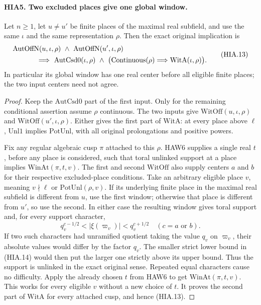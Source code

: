 \paragraph{HIA5. Two excluded places give one global window.}
\label{claim:HIA5}
Let \(n\geq1\), let \(u\ne u'\) be finite places of the
maximal real subfield, and use the same \(\iota\) and
the same representation \(\rho\).  Then the exact
original implication is
\[
 \begin{split}
 &\mathrm{AutOffN}(u,\iota,\rho)\ \wedge\
       \mathrm{AutOffN}(u',\iota,\rho)\\
 &\hspace{12mm}\Longrightarrow\
 \mathrm{AutCsd0}(\iota,\rho)\ \wedge\
       \bigl(\mathrm{Continuous}(\rho)\Longrightarrow
                                  \mathrm{WitA}(\iota,\rho)\bigr).
 \end{split}
 \tag{HIA.13}
\]
In particular its global window has one real center before
all eligible finite places; the two input centers need not agree.
\begin{proof}
Keep the \(\mathrm{AutCsd0}\) part of the first input.
Only for the remaining conditional assertion assume
\(\rho\) continuous.  The two inputs give
\(\mathrm{WitOff}(u,\iota,\rho)\) and
\(\mathrm{WitOff}(u',\iota,\rho)\).  Either gives the
first part of \(\mathrm{WitA}\): at every place above
\(\ell\), \(\mathrm{Unl1}\) implies
\(\mathrm{PotUnl}\), with all original prolongations
and positive powers.

Fix any regular algebraic cusp \(\pi\) attached to
this \(\rho\).  HAW6 supplies a single real \(t\),
before any place is considered, such that toral unlinked
support at a place implies \(\mathrm{WinAt}(\pi,t,v)\).
The first and second \(\mathrm{WitOff}\) also supply
centers \(a\) and \(b\) for their respective excluded-place
conditions.  Take an arbitrary eligible place \(v\), meaning
\(v\nmid\ell\) or \(\mathrm{PotUnl}(\rho,v)\).
If its underlying finite place in the maximal real subfield
is different from \(u\), use the first window; otherwise
that place is different from \(u'\),
so use the second.  In either case the resulting window
gives toral support and, for every support character,
\[
                    q_v^{c-1/2}<|\xi(\varpi_v)|<q_v^{c+1/2}
                     \quad(c=a\text{ or }b).
 \tag{HIA.14}
\]
If two such characters had unramified quotient taking the
value \(q_v\) on \(\varpi_v\), their absolute values
would differ by the factor \(q_v\).  The smaller strict
lower bound in (HIA.14) would then put the larger one
strictly above its upper bound.  Thus the support is
unlinked in the exact original sense.  Repeated equal
characters cause no difficulty.  Apply the already chosen
\(t\) from HAW6 to get \(\mathrm{WinAt}(\pi,t,v)\).
This works for every eligible \(v\) without a new choice
of \(t\).  It proves the second part of \(\mathrm{WitA}\)
for every attached cusp, and hence (HIA.13).
\end{proof}


